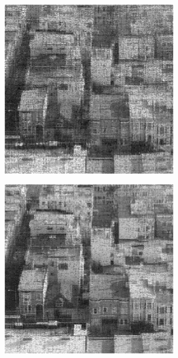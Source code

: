 \begin{figure}
    \begin{subfigure}{0.325\linewidth}
        \includegraphics[width=\linewidth]{Poglavja/Slike/kompleksnost/kompleksna grayscale 300/rez35SVT.png}
    \end{subfigure}
    \hfill
    \begin{subfigure}{0.325\linewidth}
        \includegraphics[width=\linewidth]{Poglavja/Slike/kompleksnost/kompleksna grayscale 300/rez45SVT.png}

\end{subfigure}
\end{figure}
